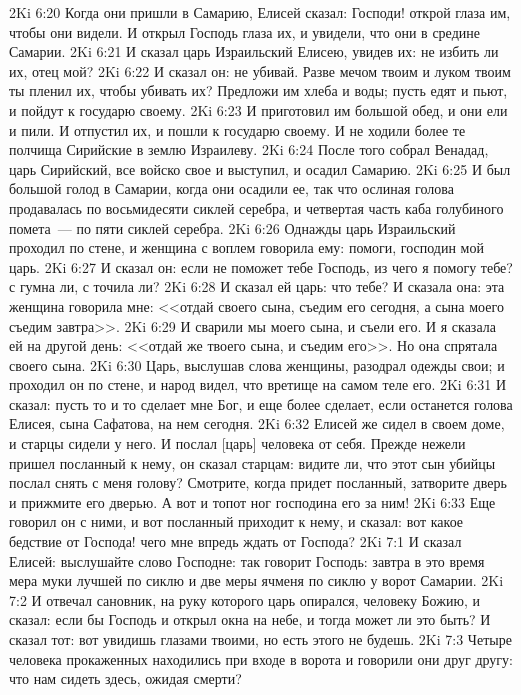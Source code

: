 \vs 2Ki 6:20 Когда они пришли в Самарию, Елисей сказал: Господи! открой глаза им, чтобы они видели. И открыл Господь глаза их, и увидели, что они в средине Самарии.
\vs 2Ki 6:21 И сказал царь Израильский Елисею, увидев их: не избить ли их, отец мой?
\vs 2Ki 6:22 И сказал он: не убивай. Разве мечом твоим и луком твоим ты пленил их, чтобы убивать их? Предложи им хлеба и воды; пусть едят и пьют, и пойдут к государю своему.
\vs 2Ki 6:23 И приготовил им большой обед, и они ели и пили. И отпустил их, и пошли к государю своему. И не ходили более те полчища Сирийские в землю Израилеву.
\rsbpar\vs 2Ki 6:24 После того собрал Венадад, царь Сирийский, все войско свое и выступил, и осадил Самарию.
\vs 2Ki 6:25 И был большой голод в Самарии, когда они осадили ее, так что ослиная голова продавалась по восьмидесяти сиклей серебра, и четвертая часть каба голубиного помета~--- по пяти сиклей серебра.
\vs 2Ki 6:26 Однажды царь Израильский проходил по стене, и женщина с воплем говорила ему: помоги, господин мой царь.
\vs 2Ki 6:27 И сказал он: если не поможет тебе Господь, из чего я помогу тебе? с гумна ли, с точила ли?
\vs 2Ki 6:28 И сказал ей царь: что тебе? И сказала она: эта женщина говорила мне: <<отдай своего сына, съедим его сегодня, а сына моего съедим завтра>>.
\vs 2Ki 6:29 И сварили мы моего сына, и съели его. И я сказала ей на другой день: <<отдай же твоего сына, и съедим его>>. Но она спрятала своего сына.
\vs 2Ki 6:30 Царь, выслушав слова женщины, разодрал одежды свои; и проходил он по стене, и народ видел, что вретище на самом теле его.
\vs 2Ki 6:31 И сказал: пусть то и то сделает мне Бог, и еще более сделает, если останется голова Елисея, сына Сафатова, на нем сегодня.
\vs 2Ki 6:32 Елисей же сидел в своем доме, и старцы сидели у него. И послал [царь] человека от себя. Прежде нежели пришел посланный к нему, он сказал старцам: видите ли, что этот сын убийцы послал снять с меня голову? Смотрите, когда придет посланный, затворите дверь и прижмите его дверью. А вот и топот ног господина его за ним!
\vs 2Ki 6:33 Еще говорил он с ними, и вот посланный приходит к нему, и сказал: вот какое бедствие от Господа! чего мне впредь ждать от Господа?
\vs 2Ki 7:1 И сказал Елисей: выслушайте слово Господне: так говорит Господь: завтра в это время мера муки лучшей  по сиклю и две меры ячменя по сиклю у ворот Самарии.
\vs 2Ki 7:2 И отвечал сановник, на руку которого царь опирался, человеку Божию, и сказал: если бы Господь и открыл окна на небе, и тогда может ли это быть? И сказал тот: вот увидишь глазами твоими, но есть этого не будешь.
\vs 2Ki 7:3 Четыре человека прокаженных находились при входе в ворота и говорили они друг другу: что нам сидеть здесь, ожидая смерти?
